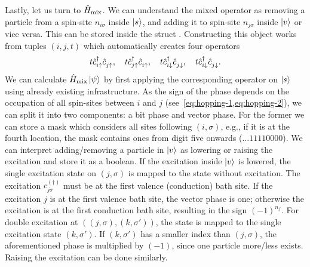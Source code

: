 Lastly, let us turn to $\hat{H}_\mathrm{mix}$.
We can understand the mixed operator as
removing a particle from a spin-site $n_{i\sigma}$ inside $\ket{s}$,
and adding it to spin-site $n_{j\sigma}$ inside $\ket{v}$ or vice versa.
This can be stored inside the struct .
Constructing this object works from tuples $(i, j, t)$
which automatically creates four operators
\begin{equation}
    t \cdag_{i\up} \cc_{j\up}, \quad
    t \cdag_{j\up} \cc_{i\up}, \quad
    t \cdag_{i\dn} \cc_{j\dn}, \quad
    t \cdag_{i\dn} \cc_{j\dn}.
\end{equation}
We can calculate $\hat{H}_{\mathrm{mix}} \ket{\psi}$ by first applying
the corresponding operator on $\ket{s}$ using already
existing infrastructure.
As the sign of the phase depends on the occupation of
all spin-sites between $i$ and $j$ (see~\cref{eq:hopping-1,eq:hopping-2}),
we can split it into two components: a bit phase and vector phase.
For the former we can store a mask which considers
all sites following $(i, \sigma)$,
e.g., if it is at the fourth location,
the mask contains ones from digit five onwards ($\ldots11110000$).
We can interpret adding/removing a particle in $\ket{v}$ as
lowering or raising the excitation and store it as a boolean.
If the excitation inside $\ket{v}$ is lowered,
the single excitation state on $(j, \sigma)$ is mapped to
the state without excitation.
The excitation $c^{(\dagger)}_{j\sigma}$ must be at the first
valence (conduction) bath site.
If the excitation $j$ is at the first valence bath site,
the vector phase is one;
otherwise the excitation is at the first conduction bath site,
resulting in the sign $(-1)^{n_f}$.
For double excitation at $((j, \sigma), (k, \sigma'))$,
the state is mapped to the single excitation state $(k, \sigma')$.
If $(k, \sigma')$ has a smaller index than $(j, \sigma)$,
the aforementioned phase is multiplied by $(-1)$,
since one particle more/less exists.
Raising the excitation can be done similarly.
